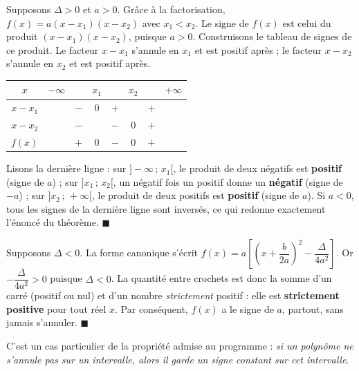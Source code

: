 \documentclass[11pt]{article}
\begin{document}
\begin{experience}
Supposons $\Delta>0$ et $a>0$. Grâce à la factorisation, $f(x)=a(x-x_1)(x-x_2)$ avec $x_1<x_2$. Le signe de $f(x)$ est celui du produit $(x-x_1)(x-x_2)$, puisque $a>0$. Construisons le tableau de signes de ce produit. Le facteur $x-x_1$ s'annule en $x_1$ et est positif après ; le facteur $x-x_2$ s'annule en $x_2$ et est positif après.

\begin{center}
\begin{tabular}{|c|ccccccc|}\hline
$x$ & $-\infty$ & & $x_1$ & & $x_2$ & & $+\infty$ \\ \hline
$x-x_1$ & & $-$ & $0$ & $+$ & & $+$ & \\ \hline
$x-x_2$ & & $-$ & & $-$ & $0$ & $+$ & \\ \hline
$f(x)$ & & $+$ & $0$ & $-$ & $0$ & $+$ & \\ \hline
\end{tabular}
\end{center}

Lisons la dernière ligne : sur $]-\infty\,;\,x_1[$, le produit de deux négatifs est \textbf{positif} (signe de $a$) ; sur $]x_1\,;\,x_2[$, un négatif fois un positif donne un \textbf{négatif} (signe de $-a$) ; sur $]x_2\,;\,+\infty[$, le produit de deux positifs est \textbf{positif} (signe de $a$). Si $a<0$, tous les signes de la dernière ligne sont inversés, ce qui redonne exactement l'énoncé du théorème. $\blacksquare$
\end{experience}

\begin{experience}
Supposons $\Delta<0$. La forme canonique s'écrit $f(x)=a\left[\left(x+\dfrac{b}{2a}\right)^2-\dfrac{\Delta}{4a^2}\right]$. Or $-\dfrac{\Delta}{4a^2}>0$ puisque $\Delta<0$. La quantité entre crochets est donc la somme d'un carré (positif ou nul) et d'un nombre \emph{strictement} positif : elle est \textbf{strictement positive} pour tout réel $x$. Par conséquent, $f(x)$ a le signe de $a$, partout, sans jamais s'annuler. $\blacksquare$

C'est un cas particulier de la propriété admise au programme : \emph{si un polynôme ne s'annule pas sur un intervalle, alors il garde un signe constant sur cet intervalle}.
\end{experience}
\end{document}

